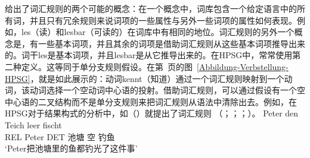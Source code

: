 \citet{Jackendoff75a}给出了词汇规则的两个可能的概念：在一个概念中，词库包含一个给定语言中的所有词，并且只有冗余规则来说词项的一些属性与另外一些词项的属性如何表现。例如，les（读）和lesbar（可读的）在词库中有相同的地位。词汇规则的另外一个概念是，有一些基本词项，并且其余的词项是借助词汇规则从这些基本词项推导出来的。词干les是基本词项，并且lesbar是从它推导出来的。在HPSG中，常常使用第二种定义。这等同于单分支规则假设。在第~\pageref{Abbildung-Verbstellung-HPSG}页的图~\ref{Abbildung-Verbstellung-HPSG}，就是如此展示的：动词kennt（知道）通过一个词汇规则映射到一个动词，该动词选择一个空动词中心语的投射。借助词汇规则，可以通过假设有一个空中心语的二叉结构而不是单分支规则来把词汇规则从语法中清除出去。例如，在HPSG对于结果构式的分析中，如（）就提出了词汇规则 （\citealp{Verspoor97a}；\citealp{Wechsler97a}；\citealp{WN2001a}；\citealp[\S~5]{Mueller2002b}）。
\ea
\gll [dass] Peter den Teich leer fischt\\
	 \spacebr{}REL Peter DET 池塘 空 钓鱼\\
\glt `Peter把池塘里的鱼都钓光了这件事'

